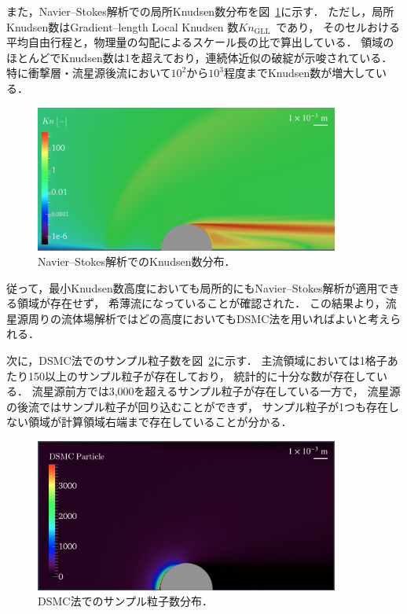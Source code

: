 また，Navier–Stokes解析での局所Knudsen数分布を図~\ref{fig:ns-kn}に示す．
ただし，局所Knudsen数はGradient–length Local Knudsen 数$Kn_\mathrm{GLL}$~\cite{boyd1995predicting}であり，
そのセルおける平均自由行程と，物理量の勾配によるスケール長の比で算出している．
領域のほとんどでKnudsen数は1を超えており，連続体近似の破綻が示唆されている．
特に衝撃層・流星源後流において$10^2$から$10^3$程度までKnudsen数が増大している．
\begin{figure}[H]
    \centering
    \includegraphics[width=10cm]{fig/min_knud/ns/kn.png}
    \caption{Navier–Stokes解析でのKnudsen数分布．}
    \label{fig:ns-kn}
\end{figure}
従って，最小Knudsen数高度においても局所的にもNavier–Stokes解析が適用できる領域が存在せず，
希薄流になっていることが確認された．
この結果より，流星源周りの流体場解析ではどの高度においてもDSMC法を用いればよいと考えられる．


次に，DSMC法でのサンプル粒子数を図~\ref{fig:dsmc-particle}に示す．
主流領域においては1格子あたり150以上のサンプル粒子が存在しており，
統計的に十分な数が存在している．
流星源前方では3,000を超えるサンプル粒子が存在している一方で，
流星源の後流ではサンプル粒子が回り込むことができず，
サンプル粒子が1つも存在しない領域が計算領域右端まで存在していることが分かる．
\begin{figure}[H]
    \centering
    \includegraphics[width=10cm,clip]{fig/min_knud/dsmc/dsmc_particle.png}
    \caption{DSMC法でのサンプル粒子数分布．}
    \label{fig:dsmc-particle}
\end{figure}

